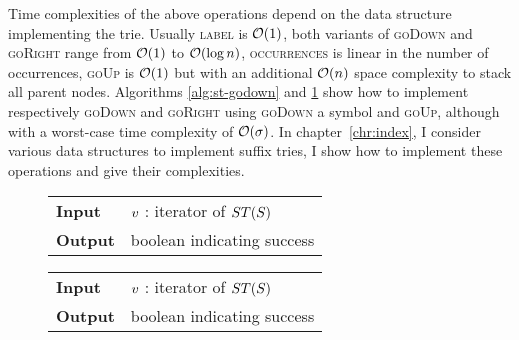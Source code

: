 Time complexities of the above operations depend on the data structure implementing the trie.
Usually \textsc{label} is $\mathcal{O}(1)$, both variants of \textsc{goDown} and \textsc{goRight} range from $\mathcal{O}(1)$ to $\mathcal{O}(\log{n})$, \textsc{occurrences} is linear in the number of occurrences, \textsc{goUp} is $\mathcal{O}(1)$ but with an additional $\mathcal{O}(n)$ space complexity to stack all parent nodes.
Algorithms \ref{alg:st-godown} and \ref{alg:st-goright} show how to implement respectively \textsc{goDown} and \textsc{goRight} using \textsc{goDown} a symbol and \textsc{goUp}, although with a worst-case time complexity of $\mathcal{O}(\sigma)$.
In chapter~\ref{chr:index}, I consider various data structures to implement suffix tries, I show how to implement these operations and give their complexities.

\begin{figure*}[t]
\begin{minipage}[t]{.5\textwidth}
\begin{algorithm}[H]
\begin{tabular}{ll}
\textbf{Input}  & $v$ : iterator of $ST(S)$\\
\textbf{Output} & boolean indicating success\\
\end{tabular}
\begin{algorithmic}[1]
	\State {$\StrieChar \gets \lexmin{\Sigma}$}
	\Do
			\State \Return \True
		\EndIf
	\DoWhile {$\StrieChar \gets \lexnext{\StrieChar}$}
\EndIf
\State \Return \False
\end{algorithmic}
\label{alg:st-godown}
\end{algorithm}
\end{minipage}
\hfill
\begin{minipage}[t]{.5\textwidth}
\begin{algorithm}[H]
\begin{tabular}{ll}
\textbf{Input}  & $v$ : iterator of $ST(S)$\\
\textbf{Output} & boolean indicating success\\
\end{tabular}
\begin{algorithmic}[1]
	\While {$\StrieChar \gets \lexnext{\StrieChar}$}
			\State \Return \True
		\EndIf
	\EndWhile
\EndIf
\State \Return \False $\phantom{()}$
\end{algorithmic}
\label{alg:st-goright}
\end{algorithm}
\end{minipage}
\end{figure*}


